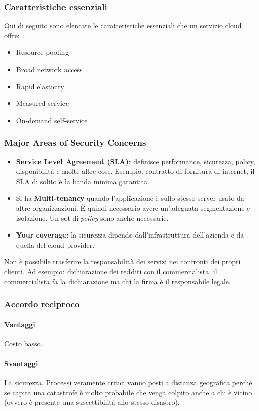 \subsubsection{Caratteristiche essenziali}

Qui di seguito sono elencate le caratteristiche essenziali che un servizio 
cloud offre:
\begin{itemize}
  \item Resource pooling
  \item Broad network access
  \item Rapid elasticity
  \item Measured service
  \item On-demand self-service
\end{itemize}

\subsubsection{Major Areas of Security Concerns}

\begin{itemize}
 \item \textbf{Service Level Agreement (SLA)}: definisce performance, 
sicurezza, policy, disponibilità e molte altre cose. Esempio: contratto di 
fornitura di internet, il SLA di solito è la banda minima garantita.

 \item Si ha \textbf{Multi-tenancy} quando l'applicazione è sullo stesso server 
usato da altre organizzazioni. È quindi necessario avere un'adeguata 
segmentazione e isolazione. Un set di \textit{policy} sono anche necessarie.

 \item \textbf{Your coverage}: la sicurezza dipende dall'infrastruttura 
dell'azienda e da quella del cloud provider.
\end{itemize}

Non è possibile trasferire la responsabilità dei servizi nei confronti dei 
propri clienti. Ad esempio: dichiarazione dei redditi con il commercialista, il 
commercialista fa la dichiarazione ma chi la firma è il responsabile legale.

\subsubsection{Accordo reciproco}

\paragraph*{Vantaggi} Costo basso. 

\paragraph*{Svantaggi}La sicurezza. Processi veramente critici vanno posti a 
distanza geografica perché se capita una catastrofe è molto probabile che venga 
colpito anche a chi è vicino (ovvero è presente una suscettibilità allo stesso 
disastro).
